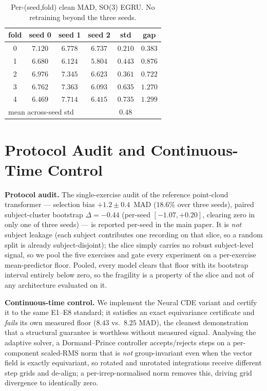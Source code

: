 \documentclass[10pt,twocolumn,letterpaper]{article}
\begin{document}
\begin{table}[t]\centering\small
\caption{Per-(seed,fold) clean MAD, SO(3) EGRU. No retraining beyond the three seeds.}
\label{tab:seed}
\begin{tabular}{cccccc}
\toprule
fold & seed 0 & seed 1 & seed 2 & std & gap \\
\midrule
0 & $7.120$ & $6.778$ & $6.737$ & $0.210$ & $0.383$ \\
1 & $6.680$ & $6.124$ & $5.804$ & $0.443$ & $0.876$ \\
2 & $6.976$ & $7.345$ & $6.623$ & $0.361$ & $0.722$ \\
3 & $6.762$ & $7.363$ & $6.093$ & $0.635$ & $1.270$ \\
4 & $6.469$ & $7.714$ & $6.415$ & $0.735$ & $1.299$ \\
\midrule
\multicolumn{4}{l}{mean across-seed std} & $\mathbf{0.48}$ & \\
\bottomrule
\end{tabular}
\end{table}

\section{Protocol Audit and Continuous-Time Control}\label{sec:supp:control}
\textbf{Protocol audit.} The single-exercise audit of the reference point-cloud transformer ---
selection bias $+1.2\pm0.4$~MAD ($18.6\%$ over three seeds), paired subject-cluster bootstrap
$\Delta=-0.44$ (per-seed $[-1.07,+0.20]$, clearing zero in only one of three seeds) --- is reported
per-seed in the main paper. It is \emph{not} subject leakage
(each subject contributes one recording on that slice, so a random split is already subject-disjoint);
the slice simply carries no robust subject-level signal, so we pool the five exercises and gate every
experiment on a per-exercise mean-predictor floor. Pooled, every model clears that floor with its
bootstrap interval entirely below zero, so the fragility is a property of the slice and not of any
architecture evaluated on it.

\textbf{Continuous-time control.} We implement the Neural CDE variant and certify it to the same E1--E8
standard; it satisfies an exact equivariance certificate and \emph{fails} its own measured floor
($8.43$ vs.\ $8.25$ MAD), the cleanest demonstration that a structural guarantee is worthless without
measured signal.
Analysing the adaptive solver, a Dormand--Prince controller accepts/rejects steps on a per-component
scaled-RMS norm that is \emph{not} group-invariant even when the vector field is exactly equivariant, so
rotated and unrotated integrations receive different step grids and de-align; a per-irrep-normalised norm
removes this, driving grid divergence to identically zero.
\end{document}
